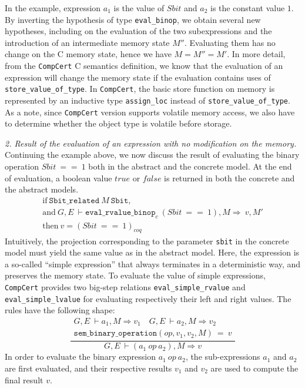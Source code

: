\documentclass{llncs}
\newcommand{\compcert}{\texttt{CompCert}\xspace}
\begin{document}
In the example, expression $a_1$ is the value of $Sbit$ and $a_2$
is the constant value $1$.  By inverting the hypothesis of type
\texttt{eval\_binop}, we obtain several new hypotheses, including on
the evaluation of the two subexpressions and the introduction of an
intermediate memory state $M''$.  Evaluating them has no change on the
C memory state, hence we have $M = M'' = M'$.
In more detail, from the \compcert C semantics definition, we know that
the evaluation of an expression will change the memory state
if the evaluation contains uses of \texttt{store\_value\_of\_type}.
In \compcert, the basic store function on memory
is represented by an inductive type \texttt{assign\_loc} instead of
\texttt{store\_value\_of\_type}.
As a note, since \compcert version supports volatile memory access,
we also have to determine whether the object type is volatile before storage.

\medskip\noindent
\textit{2. Result of the evaluation of an expression with no modification on the memory.}\\
Continuing the example above, we now discuss the result of evaluating
the binary operation $Sbit~==~1$ both in the abstract and the concrete model.
At the end of evaluation, a boolean value $true$ or $false$ is returned
in both the concrete and the abstract models.
\[
\begin{array}{l}
\textrm{if} ~ \texttt{Sbit\_related}~M~\texttt{Sbit},\\
\textrm{and} ~ G,E~\vdash \texttt{eval\_rvalue\_binop}_c~(Sbit~==~1),  M\Rightarrow~v,M'\\
\textrm{then} ~ v=(Sbit~==~1)_{coq}
\end{array}
\]
Intuitively, the projection corresponding to the parameter
\texttt{sbit} in the concrete model must yield the same value as in
the abstract model.  Here, the expression is a so-called ``simple
expression'' that always terminates in a deterministic way, and
preserves the memory state.  To evaluate the value of simple
expressions, \compcert provides two big-step relations
\texttt{eval\_simple\_rvalue} and \texttt{eval\_simple\_lvalue} for
evaluating respectively their left and right values.  The rules have
the following shape:
\[
\dfrac{
\begin{array}{l}
G,E~\vdash a_1,M\Rightarrow v_1 \quad G,E~\vdash a_2,M\Rightarrow v_2\\
\texttt{sem\_binary\_operation}(op,v_1,v_2,M)~=~v
\end{array}}
{G,E~\vdash (a_1~op~a_2),M\Rightarrow v}
\]
In order to evaluate the binary expression $a_1~op~a_2$,
the sub-expressions $a_1$ and $a_2$ are first evaluated,
and their respective results $v_1$ and $v_2$ are used
to compute the final result $v$.
\end{document}
